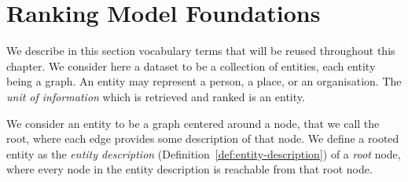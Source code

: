 %
%

\section{Ranking Model Foundations}

We describe in this section vocabulary terms that will be reused throughout this chapter. We consider here a dataset to be a collection of entities, each entity being a graph. An entity may represent a person, a place, or an organisation. The \emph{unit of information} which is retrieved and ranked is an entity.

We consider an entity to be a graph centered around a node, that we call the root, where each edge provides some description of that node. We define a rooted entity as the \emph{entity description} (Definition~\ref{def:entity-description}) of a \emph{root} node, where every node in the entity description is reachable from that root node.

